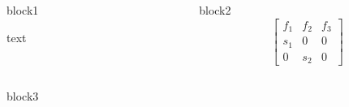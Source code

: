 \documentclass{beamer}
\begin{document}
\begin{frame}
\begin{columns}[onlytextwidth]
    \begin{column}{0.45\textwidth}
        \begin{block}{block1}
          \begin{minipage}[c][0.16\textheight][c]{\linewidth} 
            text
          \end{minipage}
        \end{block}
    \end{column}
    \begin{column}{0.45\textwidth}
        \begin{block}{block2}
            \[
                \begin{bmatrix}
                    f_{1} & f_{2} & f_{3}\\
                    s_{1} & 0 & 0 \\ 
                    0 & s_{2} & 0 
                \end{bmatrix}
            \]
        \end{block}
    \end{column}    
\end{columns}

\begin{block}{block3}

\end{block}
\end{frame}
\end{document}

